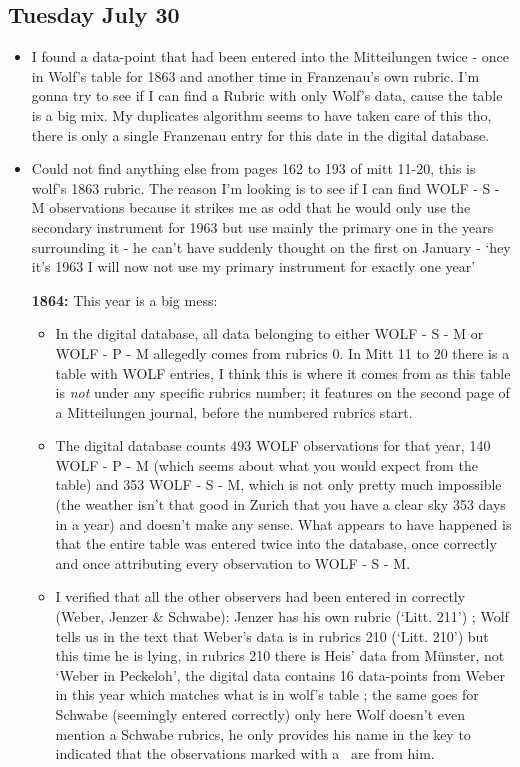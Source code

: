\documentclass[12pt]{article}
\begin{document}
\subsection{Tuesday July 30}
\begin{itemize}
    \item I found a data-point that had been entered into the Mitteilungen twice - once in Wolf's table for 1863 and another time in Franzenau's own rubric. I'm gonna try to see if I can find a Rubric with only Wolf's data, cause the table is a big mix. My duplicates algorithm seems to have taken care of this tho, there is only a single Franzenau entry for this date in the digital database.
    \item Could not find anything else from pages 162 to 193 of mitt 11-20, this is wolf's 1863 rubric. The reason I'm looking is to see if I can find WOLF - S - M observations because it strikes me as odd that he would only use the secondary instrument for 1963 but use mainly the primary one in the years surrounding it - he can't have suddenly thought on the first on January - `hey it's 1963 I will now not use my primary instrument for exactly one year'
    \item[\textbf{1864:}] This year is a big mess:
    \begin{itemize}[$\longrightarrow$]
        \item In the digital database, all data belonging to either WOLF - S - M or WOLF - P - M allegedly comes from rubrics 0. In Mitt 11 to 20 there is a table with WOLF entries, I think this is where it comes from as this table is \textit{not} under any specific rubrics number; it features on the second page of a Mitteilungen journal, before the numbered rubrics start.
        \item The digital database counts 493 WOLF observations for that year, 140 WOLF - P - M (which seems about what you would expect from the table) and 353 WOLF - S - M, which is not only pretty much impossible (the weather isn't that good in Zurich that you have a clear sky 353 days in a year) and doesn't make any sense. What appears to have happened is that the entire table was entered twice into the database, once correctly and once attributing every observation to WOLF - S - M. 
        \item I verified that all the other observers had been entered in correctly (Weber, Jenzer & Schwabe): Jenzer has his own rubric (`Litt. 211') ; Wolf tells us in the text that Weber's data is in rubrics 210 (`Litt. 210') but this time he is lying, in rubrics 210 there is Heis' data from Münster, not `Weber in Peckeloh', the digital data contains 16 data-points from Weber in this year which matches what is in wolf's table ; the same goes for Schwabe (seemingly entered correctly) only here Wolf doesn't even mention a Schwabe rubrics, he only provides his name in the key to indicated that the observations marked with a \dag\ are from him.

\end{itemize}
\end{itemize}
\end{document}
